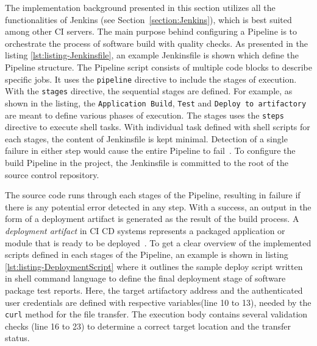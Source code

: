 The implementation background presented in this section utilizes all the functionalities of Jenkins (see Section~\ref{section:Jenkins}), which is best suited among other CI servers. The main purpose behind configuring a Pipeline is to orchestrate the process of software build with quality checks. As presented in the listing \ref{lst:listing-Jenkinsfile}, an example Jenkinsfile is shown which define the Pipeline structure. The Pipeline script consists of multiple code blocks to describe specific jobs. It uses the \texttt{pipeline} directive to include the stages of execution. With the \texttt{stages} directive, the sequential stages are defined. For example, as shown in the listing, the \texttt{Application Build}, \texttt{Test} and \texttt{Deploy to artifactory} are meant to define various phases of execution. The stages uses the \texttt{steps} directive to execute shell tasks. With individual task defined with shell scripts for each stages, the content of Jenkinsfile is kept minimal. Detection of a single failure in either step would cause the entire Pipeline to fail~\parencite{soni2015end}. To configure the build Pipeline in the project, the Jenkinsfile is committed to the root of the source control repository.

\vspace{0.5cm}
\lstset{style=mystyle}

\vspace{0.5cm}

The source code runs through each stages of the Pipeline, resulting in failure if there is any potential error detected in any step. With a success, an output in the form of a deployment artifact is generated as the result of the build process. A \emph{deployment artifact} in \ac{CI} \ac{CD} systems represents a packaged application or module that is ready to be deployed~\parencite{railic2021architecting}. To get a clear overview of the implemented scripts defined in each stages of the Pipeline, an example is shown in listing \ref{lst:listing-DeploymentScript} where it outlines the sample deploy script written in shell command language to define the final deployment stage of software package test reports. Here, the target artifactory address and the authenticated user credentials are defined with respective variables(line 10 to 13), needed by the \texttt{curl} method for the file transfer. The execution body contains several validation checks (line 16 to 23) to determine a correct target location and the transfer status.



